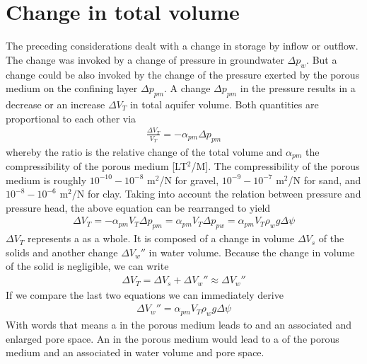 \documentclass[letterpaper,10pt,english]{jupyterBook}
\begin{document}
\section{Change in total volume}
\label{\detokenize{content/flow/L3/13_gw_storage:change-in-total-volume}}
\sphinxAtStartPar
The preceding considerations dealt with a change in storage by inflow or outflow. The change was invoked by a change of pressure in groundwater \(\Delta p_w\). But a change could be also invoked by the change of the pressure exerted by the porous medium on the confining layer \(\Delta p_{pm}\). A change \(\Delta p_{pm}\) in the pressure results in a decrease or an increase \(\Delta V_T\) in total aquifer volume. Both quantities are proportional to each other via
\begin{equation*}
\begin{split}
\frac{\Delta V_T}{V_T} = - \alpha_{pm} \Delta p_{pm}
\end{split}
\end{equation*}
\sphinxAtStartPar
whereby the ratio is the relative change of the total volume and \(\alpha_{pm}\) the compressibility of the porous medium {[}LT\(^2\)/M{]}. The compressibility of the porous medium is roughly \(10^{-10} - 10^{-8}\) m\(^2\)/N for gravel,
\(10^{-9} -  10^{-7}\) m\(^2\)/N for sand, and \(10^{-8} - 10^{-6}\) m\(^2\)/N for clay. Taking into account the relation between pressure and pressure head, the above equation can be rearranged to yield
\begin{equation*}
\begin{split}
\Delta V_T = -\alpha_{pm}V_T\Delta p_{pm} = \alpha_{pm}V_T\Delta p_{pw} = \alpha_{pm}V_T\rho_w g \Delta \psi
\end{split}
\end{equation*}
\sphinxAtStartPar
\(\Delta V_T\) represents a  as a whole. It is composed of a change in volume \(\Delta V_s\) of the solids and another change \(\Delta V_w''\) in water volume. Because the change in volume of the solid is negligible, we can write
\begin{equation*}
\begin{split}
\Delta V_T = \Delta V_s + \Delta V_w'' \approx \Delta V_w''
\end{split}
\end{equation*}
\sphinxAtStartPar
If we compare the last two equations we can immediately derive
\begin{equation*}
\begin{split}
\Delta V_w'' = \alpha_{pm} V_T\rho_w g \Delta\psi
\end{split}
\end{equation*}
\sphinxAtStartPar
With words that means a  in the porous medium leads to  and an associated  and enlarged pore space. An  in the porous medium would lead to a  of the porous medium and an associated  in water volume and  pore space.
\end{document}
